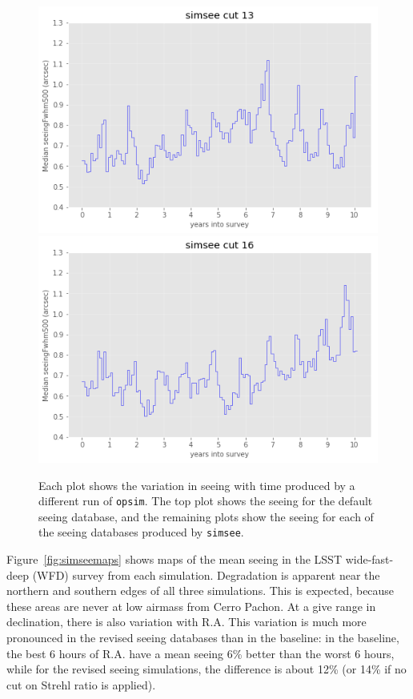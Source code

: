 \documentclass[DM,authoryear,toc]{lsstdoc}
\begin{document}
\begin{figure}
\endminipage\hfill
{}
  \includegraphics[width=\columnwidth]{./figures/seeing_ss58779y13_v1_3_10yrs.png}
\endminipage\hfill
{}
  \includegraphics[width=\columnwidth]{./figures/seeing_ss58779y16_v1_3_10yrs.png}
\endminipage\hfill
  \caption{Each plot shows the variation in seeing with time
    produced by a different run of \texttt{opsim}. The top plot
    shows the seeing for the default seeing database, and the
    remaining plots show the seeing for each of the seeing databases
    produced by \texttt{simsee}.} 
  \label{fig:simseecomp}
\end{figure}

Figure~\ref{fig:simseemaps} shows maps of the mean seeing in the LSST
wide-fast-deep (WFD) survey from each simulation. Degradation is
apparent near the northern and southern edges of all three
simulations. This is expected, because these areas are never at low
airmass from Cerro Pachon. At a give range in declination, there is
also variation with R.A. This variation is much more pronounced in the
revised seeing databases than in the baseline: in the baseline, the
best 6 hours of R.A. have a mean seeing 6\% better than the worst 6
hours, while for the revised seeing simulations, the difference is
about 12\% (or 14\% if no cut on Strehl ratio is applied). 
\end{document}
